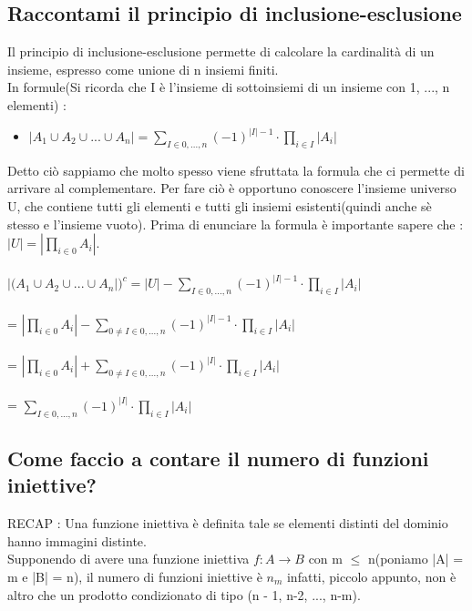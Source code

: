 \documentclass[a4paper,12pt]{report}
\begin{document}
	\subsection{Raccontami il principio di inclusione-esclusione}
	Il principio di inclusione-esclusione permette di calcolare la cardinalità di un insieme, espresso come unione di n insiemi finiti. \\
	In formule(Si ricorda che I	è l'insieme di sottoinsiemi di un insieme con {1, ..., n} elementi) : 
	\begin{itemize}
		\item $|A_1 \cup A_2 \cup ... \cup A_n| = \sum_{I \in {0, ..., n}}(-1)^{|I|-1} \cdot \prod_{i \in I}|A_i| $
	\end{itemize}
	Detto ciò sappiamo che molto spesso viene sfruttata la formula che ci permette di arrivare al complementare. Per fare ciò è opportuno conoscere l'insieme universo U, che contiene tutti gli elementi e tutti gli insiemi esistenti(quindi anche sè stesso e l'insieme vuoto). Prima di enunciare la formula è importante sapere che : $|U| = |\prod_{i \in 0}A_i|$. \\ \\
	$|(A_1 \cup A_2 \cup ... \cup A_n|)^c = |U| -  \sum_{I \in {0, ..., n}}(-1)^{|I|-1} \cdot \prod_{i \in I}|A_i|$ \\\\
	= $|\prod_{i \in 0}A_i| - \sum_{0 \neq I \in {0, ..., n}}(-1)^{|I|-1} \cdot \prod_{i \in I}|A_i|$  \\\\
	= $|\prod_{i \in 0}A_i| + \sum_{0 \neq I \in {0, ..., n}}(-1)^{|I|} \cdot \prod_{i \in I}|A_i|$ \\\\
	= $\sum_{I \in {0, ..., n}}(-1)^{|I|} \cdot \prod_{i \in I}|A_i|$
	\subsection{Come faccio a contare il numero di funzioni iniettive?} 
	RECAP : Una funzione iniettiva è definita tale se elementi distinti del dominio hanno immagini distinte. \\
	Supponendo di avere una funzione iniettiva $f:A \rightarrow B$ con m $\leq$ n(poniamo |A| = m e |B| = n), il numero di funzioni iniettive è $n_{m}$ infatti, piccolo appunto, non è altro che un prodotto condizionato di tipo (n - 1, n-2,  ..., n-m).
\end{document}
